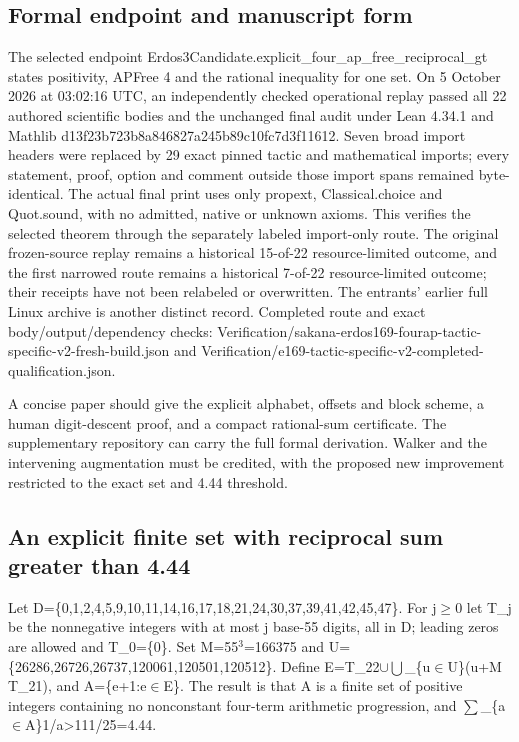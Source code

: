 \documentclass[11pt,a4paper]{article}
\begin{document}
\subsection{Formal endpoint and manuscript form}
The selected endpoint Erdos3Candidate.explicit\_four\_ap\_free\_reciprocal\_gt states positivity, APFree 4 and the rational inequality for one set. On 5 October 2026 at 03:02:16 UTC, an independently checked operational replay passed all 22 authored scientific bodies and the unchanged final audit under Lean 4.34.1 and Mathlib d13f23b723b8a846827a245b89c10fc7d3f11612. Seven broad import headers were replaced by 29 exact pinned tactic and mathematical imports; every statement, proof, option and comment outside those import spans remained byte-identical. The actual final print uses only propext, Classical.choice and Quot.sound, with no admitted, native or unknown axioms. This verifies the selected theorem through the separately labeled import-only route. The original frozen-source replay remains a historical 15-of-22 resource-limited outcome, and the first narrowed route remains a historical 7-of-22 resource-limited outcome; their receipts have not been relabeled or overwritten. The entrants' earlier full Linux archive is another distinct record. Completed route and exact body/output/dependency checks: Verification/sakana-erdos169-fourap-tactic-specific-v2-fresh-build.json and Verification/e169-tactic-specific-v2-completed-qualification.json.

A concise paper should give the explicit alphabet, offsets and block scheme, a human digit-descent proof, and a compact rational-sum certificate. The supplementary repository can carry the full formal derivation. Walker and the intervening augmentation must be credited, with the proposed new improvement restricted to the exact set and 4.44 threshold.

\subsection{An explicit finite set with reciprocal sum greater than 4.44}
Let D=\{0,1,2,4,5,9,10,11,14,16,17,18,21,24,30,37,39,41,42,45,47\}. For j\ensuremath{\geq}0 let T\_j be the nonnegative integers with at most j base-55 digits, all in D; leading zeros are allowed and T\_0=\{0\}. Set M=55\ensuremath{^3}=166375 and U=\{26286,26726,26737,120061,120501,120512\}. Define E=T\_22\ensuremath{\cup}\ensuremath{\bigcup}\_\{u\ensuremath{\in}U\}(u+M T\_21), and A=\{e+1:e\ensuremath{\in}E\}. The result is that A is a finite set of positive integers containing no nonconstant four-term arithmetic progression, and \ensuremath{\sum}\_\{a\ensuremath{\in}A\}1/a>111/25=4.44.
\end{document}
